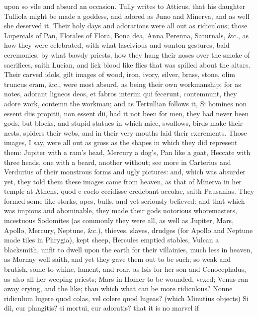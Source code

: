 {upon so vile and absurd an occasion. Tully writes to Atticus, that his
daughter Tulliola might be made a goddess, and adored as Juno and
Minerva, and as well she deserved it. Their holy days and adorations
were all out as ridiculous; those Lupercals of Pan, Florales of Flora,
Bona dea, Anna Perenna, Saturnals, \&c., as how they were celebrated,
with what lascivious and wanton gestures, bald ceremonies, by
what bawdy priests, how they hang their noses over the smoke of
sacrifices, saith Lucian, and lick blood like flies that was
spilled about the altars. Their carved idols, gilt images of wood,
iron, ivory, silver, brass, stone, olim truncus eram, \&c., were most
absurd, as being their own workmanship; for as \Seneca notes, adorant
ligneos deos, et fabros interim qui fecerunt, contemnunt, they adore
work, contemn the workman; and as Tertullian follows it, Si homines non
essent diis propitii, non essent dii, had it not been for men, they had
never been gods, but blocks, and stupid statues in which mice,
swallows, birds make their nests, spiders their webs, and in their very
mouths laid their excrements. Those images, I say, were all out as
gross as the shapes in which they did represent them: Jupiter with a
ram's head, Mercury a dog's, Pan like a goat, Heccate with three heads,
one with a beard, another without; see more in Carterius and
Verdurius of their monstrous forms and ugly pictures: and, which
was absurder yet, they told them these images came from heaven, as that
of Minerva in her temple at Athens, quod e coelo cecidisse credebant
accolae, saith Pausanias. They formed some like storks, apes, bulls,
and yet seriously believed: and that which was impious and abominable,
they made their gods notorious whoremasters, incestuous Sodomites (as
commonly they were all, as well as Jupiter, Mars, Apollo, Mercury,
Neptune, \&c.), thieves, slaves, drudges (for Apollo and Neptune made
tiles in Phrygia), kept sheep, Hercules emptied stables, Vulcan a
blacksmith, unfit to dwell upon the earth for their villainies, much
less in heaven, as Mornay well saith, and yet they gave them out
to be such; so weak and brutish, some to whine, lament, and roar, as
Isis for her son and Cenocephalus, as also all her weeping priests;
Mars in Homer to be wounded, vexed; Venus ran away crying, and the
like; than which what can be more ridiculous? Nonne ridiculum lugere
quod colas, vel colere quod lugeas? (which Minutius objects) Si
dii, cur plangitis? si mortui, cur adoratis? that it is no marvel if
}
